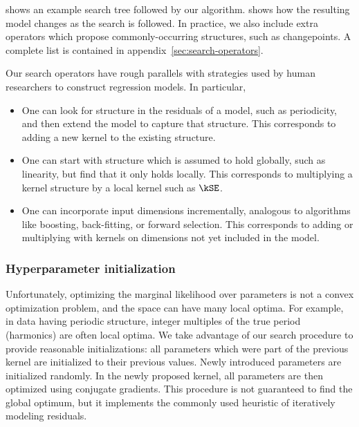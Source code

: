  shows an example search tree followed by our algorithm.
 shows how the resulting model changes as the search is followed.
In practice, we also include extra operators which propose commonly-occurring structures, such as changepoints.
A complete list is contained in appendix~\ref{sec:search-operators}.

Our search operators have rough parallels with strategies used by human researchers to construct regression models.
In particular,
\begin{itemize}
\item One can look for structure in the residuals of a model, such as periodicity, and then extend the model to capture that structure.
This corresponds to adding a new kernel to the existing structure.
\item One can start with structure which is assumed to hold globally, such as linearity, but find that it only holds locally.
This corresponds to multiplying a kernel structure by a local kernel such as $\kSE$.
\item One can incorporate input dimensions incrementally, analogous to algorithms like boosting, back-fitting, or forward selection.
This corresponds to adding or multiplying with kernels on dimensions not yet included in the model.
\end{itemize}





\subsubsection{Hyperparameter initialization}

Unfortunately, optimizing the marginal likelihood over parameters is not a convex optimization problem, and the space can have many local optima.
For example, in data having periodic structure, integer multiples of the true period (harmonics) are often local optima. 
We take advantage of our search procedure to provide reasonable initializations: all parameters which were part of the previous kernel are initialized to their previous values. Newly introduced parameters are initialized randomly.
In the newly proposed kernel, all parameters are then optimized using conjugate gradients.
This procedure is not guaranteed to find the global optimum, but it implements the commonly used heuristic of iteratively modeling residuals.






